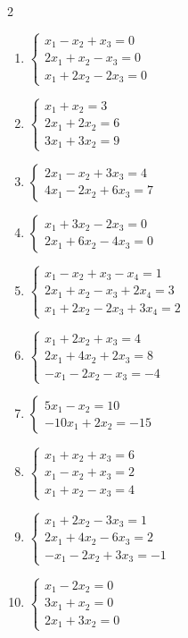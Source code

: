 \begin{multicols}{2}
\begin{enumerate}[label=\arabic*.,  leftmargin=*]
\item $\begin{cases}x_1-x_2+x_3=0\\2x_1+x_2-x_3=0\\x_1+2x_2-2x_3=0\end{cases}$
\item $\begin{cases}x_1+x_2=3\\2x_1+2x_2=6\\3x_1+3x_2=9\end{cases}$
\item $\begin{cases}2x_1-x_2+3x_3=4\\4x_1-2x_2+6x_3=7\end{cases}$
\item $\begin{cases}x_1+3x_2-2x_3=0\\2x_1+6x_2-4x_3=0\end{cases}$
\item $\begin{cases}x_1-x_2+x_3-x_4=1\\2x_1+x_2-x_3+2x_4=3\\x_1+2x_2-2x_3+3x_4=2\end{cases}$
\item $\begin{cases}x_1+2x_2+x_3=4\\2x_1+4x_2+2x_3=8\\-x_1-2x_2-x_3=-4\end{cases}$
\item $\begin{cases}5x_1-x_2=10\\-10x_1+2x_2=-15\end{cases}$
\item $\begin{cases}x_1+x_2+x_3=6\\x_1-x_2+x_3=2\\x_1+x_2-x_3=4\end{cases}$
\item $\begin{cases}x_1+2x_2-3x_3=1\\2x_1+4x_2-6x_3=2\\-x_1-2x_2+3x_3=-1\end{cases}$
\item $\begin{cases}x_1-2x_2=0\\3x_1+x_2=0\\2x_1+3x_2=0\end{cases}$

\end{enumerate}
\end{multicols}
